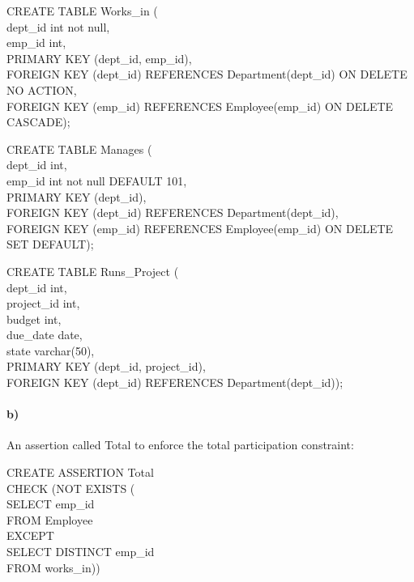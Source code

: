 \documentclass[a4paper,12pt]{article}
\begin{document}
\begin{tcolorbox}
CREATE TABLE Works\_in ( \\
	dept\_id int not null, \\
	emp\_id int, \\
	PRIMARY KEY (dept\_id, emp\_id), \\
  	FOREIGN KEY (dept\_id) REFERENCES Department(dept\_id) ON DELETE NO ACTION, \\
  	FOREIGN KEY (emp\_id) REFERENCES Employee(emp\_id) ON DELETE CASCADE);
\end{tcolorbox}

\begin{tcolorbox}
CREATE TABLE Manages ( \\
	dept\_id int, \\
	emp\_id int not null DEFAULT 101, \\
	PRIMARY KEY (dept\_id), \\
  	FOREIGN KEY (dept\_id) REFERENCES Department(dept\_id), \\
  	FOREIGN KEY (emp\_id) REFERENCES Employee(emp\_id) ON DELETE SET DEFAULT);
\end{tcolorbox}

\begin{tcolorbox}
CREATE TABLE Runs\_Project ( \\
	dept\_id int, \\
	project\_id int, \\
	budget int, \\
	due\_date date, \\
	state varchar(50), \\
	PRIMARY KEY (dept\_id, project\_id), \\
  	FOREIGN KEY (dept\_id) REFERENCES Department(dept\_id));
\end{tcolorbox}

\newpage
\paragraph{b)} An assertion called Total to enforce the total participation constraint: \\

\begin{tcolorbox}
CREATE ASSERTION Total \\
CHECK (NOT EXISTS ( \\
                    SELECT emp\_id \\
                    FROM Employee \\
                    EXCEPT \\
                    SELECT DISTINCT emp\_id \\
                    FROM works\_in))
\end{tcolorbox}
\end{document}

